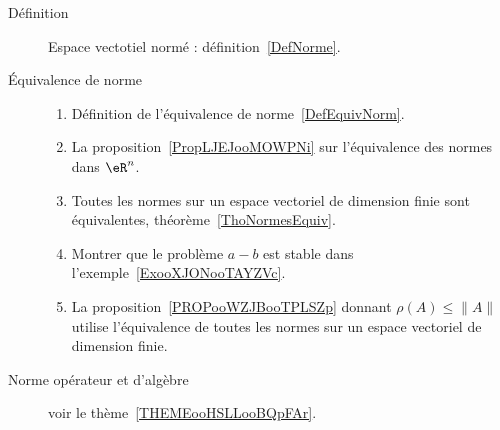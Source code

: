       \label{THEMEooUJVXooZdlmHj}

\begin{description}
    \item[Définition] Espace vectotiel normé : définition~\ref{DefNorme}.
    \item[Équivalence de norme]

        \begin{enumerate}
        \item
            Définition de l'équivalence de norme~\ref{DefEquivNorm}.
\item
    La proposition~\ref{PropLJEJooMOWPNi} sur l'équivalence des normes dans \( \eR^n\).
\item
    Toutes les normes sur un espace vectoriel de dimension finie sont équivalentes, théorème~\ref{ThoNormesEquiv}.
\item
    Montrer que le problème \( a-b\) est stable dans l'exemple~\ref{ExooXJONooTAYZVc}.
\item
    La proposition~\ref{PROPooWZJBooTPLSZp} donnant \( \rho(A)\leq \| A \|\) utilise l'équivalence de toutes les normes sur un espace vectoriel de dimension finie.

        \end{enumerate}

    \item[Norme opérateur et d'algèbre] voir le thème~\ref{THEMEooHSLLooBQpFAr}.

\end{description}
